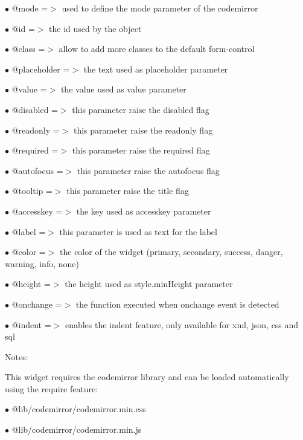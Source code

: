 \documentclass[a4paper]{article}
\begin{document}
\begin{compactitem}
\item[\color{myblue}$\bullet$] @mode        =$>$ used to define the mode parameter of the codemirror
\item[\color{myblue}$\bullet$] @id          =$>$ the id used by the object
\item[\color{myblue}$\bullet$] @class       =$>$ allow to add more classes to the default form-control
\item[\color{myblue}$\bullet$] @placeholder =$>$ the text used as placeholder parameter
\item[\color{myblue}$\bullet$] @value       =$>$ the value used as value parameter
\item[\color{myblue}$\bullet$] @disabled    =$>$ this parameter raise the disabled flag
\item[\color{myblue}$\bullet$] @readonly    =$>$ this parameter raise the readonly flag
\item[\color{myblue}$\bullet$] @required    =$>$ this parameter raise the required flag
\item[\color{myblue}$\bullet$] @autofocus   =$>$ this parameter raise the autofocus flag
\item[\color{myblue}$\bullet$] @tooltip     =$>$ this parameter raise the title flag
\item[\color{myblue}$\bullet$] @accesskey   =$>$ the key used as accesskey parameter
\item[\color{myblue}$\bullet$] @label       =$>$ this parameter is used as text for the label
\item[\color{myblue}$\bullet$] @color       =$>$ the color of the widget (primary, secondary, success, danger, warning, info, none)
\item[\color{myblue}$\bullet$] @height      =$>$ the height used as style.minHeight parameter
\item[\color{myblue}$\bullet$] @onchange    =$>$ the function executed when onchange event is detected
\item[\color{myblue}$\bullet$] @indent      =$>$ enables the indent feature, only available for xml, json, css and sql
\end{compactitem}

Notes:

This widget requires the codemirror library and can be loaded automatically using the require
feature:

\begin{compactitem}
\item[\color{myblue}$\bullet$] @lib/codemirror/codemirror.min.css
\item[\color{myblue}$\bullet$] @lib/codemirror/codemirror.min.js
\end{compactitem}
\end{document}
